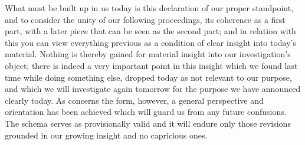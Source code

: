 What must be built up in us today is
this declaration of our proper standpoint,
and to consider the unity of our following proceedings,
its coherence as a first part,
with a later piece that can be seen as the second part;
and in relation with this you can view
everything previous as a condition of
clear insight into today's material.
Nothing is thereby gained for material insight
into our investigation's object;
there is indeed a very important point in this insight
which we found last time while doing something else,
dropped today as not relevant to our purpose,
and which we will investigate again tomorrow
for the purpose we have announced clearly today.
As concerns the form, however,
a general perspective and orientation has been achieved
which will guard us from any future confusions.
The schema serves as provisionally valid
and it will endure only those revisions
grounded in our growing insight and no capricious ones.

